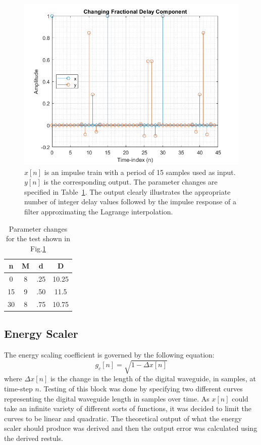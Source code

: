 \documentclass[../main.tex]{subfiles}
\begin{document}
\begin{figure}[h!]
    \centering
    \includegraphics[scale=.65]{./images/plots/LagrangeTest3.png}
    \caption{$x[n]$ is an impulse train with a period of 15 samples used as input. $y[n]$ is the corresponding output. The parameter changes are specified in Table~\ref{tab:LagrangeTest3}. The output clearly illustrates the appropriate number of integer delay values followed by the impulse response of a filter approximating the Lagrange interpolation.}
    \label{fig:LagrangeTest3}
\end{figure}

\begin{table}[h!]
    \centering
     \begin{tabular}{||c| |c |c |c|} 
         \hline
         \textbf{n} & \textbf{M} & \textbf{d} & \textbf{D} \\ [0.5ex] 
         \hline
         0 & 8 & .25 & 10.25 \\ 
         \hline
         15 & 9 & .50 & 11.5 \\
         \hline
         30 & 8 & .75 & 10.75 \\
         \hline
    \end{tabular}
    \caption{Parameter changes for the test shown in Fig.\ref{fig:LagrangeTest3}}
    \label{tab:LagrangeTest3}
\end{table}

\subsection{Energy Scaler}
The energy scaling coefficient is governed by the following equation:
\begin{equation}
    g_c[n] = \sqrt{1-\Delta x[n]}
\end{equation}
where $\Delta x[n]$ is the change in the length of the digital waveguide, in samples, at time-step $n$. Testing of this block was done by specifying two different curves representing the digital waveguide length in samples over time. As $x[n]$ could take an infinite variety of different sorts of functions, it was decided to limit the curves to be linear and quadratic. The theoretical output of what the energy scaler should produce was derived and then the output error was calculated using the derived restuls.
\end{document}
